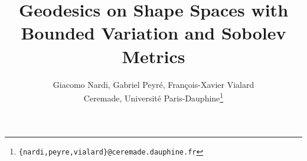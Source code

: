 \documentclass[12pt]{article}
\usepackage{mystyle}

\newenvironment{simplified}{simplified}



\usepackage[latin1]{inputenc}
\usepackage{amsmath,amsthm,amssymb, bbm, tikz, verbatim, mathrsfs,bbm} \usepackage{comment}
\usepackage{graphicx}
\usepackage{framed}


\graphicspath{{./images/}}

\usepackage{pdfsync}
\usepackage{epsfig}
\usepackage{epstopdf}
\usepackage{url}



\usepackage{ifb}
\newcommand{\todo}[1]{
\par
{\color{blue}
\begin{framed}
TODO: #1
\end{framed}
}
}
\graphicspath{{./images/}}
 
\title{Geodesics on Shape Spaces
with \\ Bounded Variation and Sobolev Metrics}




\author{
	\begin{tabular}{c}
		Giacomo Nardi, Gabriel Peyr\'e,  Fran\c{c}ois-Xavier Vialard \\[2mm]
		Ceremade, Universit\'e Paris-Dauphine\footnote{\texttt{\{nardi,peyre,vialard\}@ceremade.dauphine.fr}}\\
	\end{tabular}	
}
\date{}




\maketitle
{}







\newpage
	










